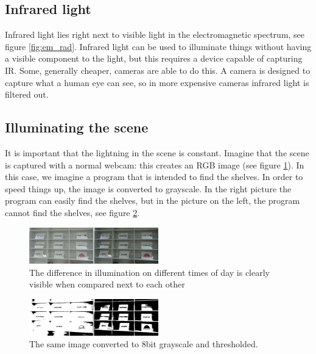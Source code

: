 \subsection{Infrared light}

Infrared light lies right next to visible light in the electromagnetic spectrum, see figure \ref{fig:em_rad}. Infrared light can be used to illuminate things without having a visible component to the light, but this requires a device capable of capturing IR. Some, generally cheaper, cameras are able to do this. A camera is designed to capture what a human eye can see, so in more expensive cameras infrared light is filtered out.


\subsection{Illuminating the scene}

It is important that the lightning in the scene is constant. Imagine that the scene is captured with a normal webcam: this creates an RGB image (see figure \ref{fig:scene_light}). In this case, we imagine a program that is intended to find the shelves. In order to speed things up, the image is converted to grayscale. In the right picture the program can easily find the shelves, but in the picture on the left, the program cannot find the shelves, see figure \ref{fig:scene_thresholded}.

\begin{figure}[htbp] 
\centering 
\includegraphics[width=0.5\textwidth]{Pictures/HjoerringLibrary/scene_lighting.png} 
\caption{The difference in illumination on different times of day is clearly visible when compared next to each other} 
\label{fig:scene_light} 
\end{figure}

\begin{figure}[htbp] 
\centering 
\includegraphics[width=0.5\textwidth]{Pictures/HjoerringLibrary/scene_lighting_thresholded.png} 
\caption{The same image converted to 8bit grayscale and thresholded.} 
\label{fig:scene_thresholded} 
\end{figure}


